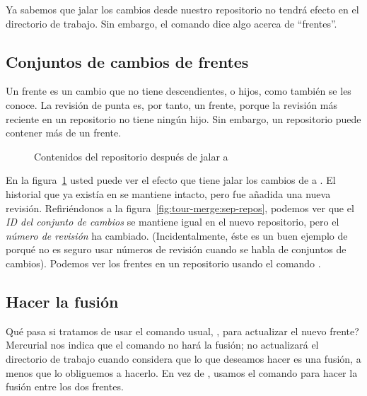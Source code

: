Ya sabemos que jalar los cambios desde nuestro repositorio
 no tendrá efecto en el directorio de trabajo.
Sin embargo, el comando  dice algo acerca de
``frentes''.  

\subsection{Conjuntos de cambios de frentes}

Un frente es un cambio que no tiene descendientes, o hijos, como
también se les conoce. La revisión de punta es, por tanto, un frente,
porque la revisión más reciente en un repositorio no tiene ningún
hijo. Sin embargo, un repositorio puede contener más de un frente.

\begin{figure}[ht]
  \centering
  \caption{Contenidos del repositorio después de jalar
       a }
  \label{fig:tour-merge:pull}
\end{figure}

En la figura~\ref{fig:tour-merge:pull} usted puede ver el efecto que
tiene jalar los cambios de  a .
El historial que ya existía en  se mantiene
intacto, pero fue añadida una nueva revisión. Refiriéndonos a la
figura~\ref{fig:tour-merge:sep-repos}, podemos ver que el \emph{ID del
conjunto de cambios} se mantiene igual en el nuevo repositorio, pero
el \emph{número de revisión} ha cambiado.  (Incidentalmente, éste es un
buen ejemplo de porqué no es seguro usar números de revisión cuando se
habla de conjuntos de cambios).  Podemos ver los frentes en un
repositorio usando el comando .

\subsection{Hacer la fusión}

Qué pasa si tratamos de usar el comando usual, , para
actualizar el nuevo frente?
Mercurial nos indica que el comando  no hará la fusión;
no actualizará el directorio de trabajo cuando considera que lo que
deseamos hacer es una fusión, a menos que lo obliguemos a hacerlo.
En vez de , usamos el comando  para hacer
la fusión entre los dos frentes.

